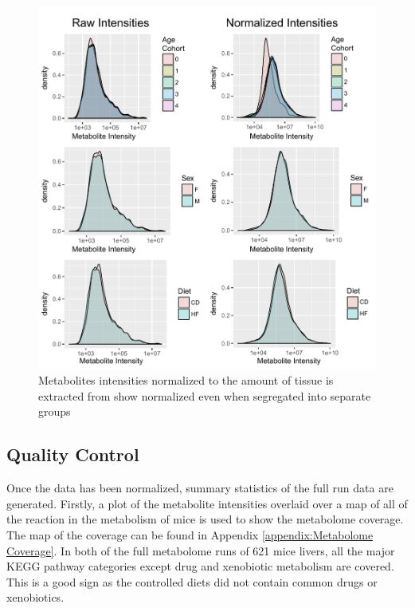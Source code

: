 \documentclass[a4paper,11pt,twoside]{book}
\begin{document}
	\begin{figure}[ht!b]
		\centering
		\includegraphics[width=\linewidth]{3.Metabolomics/Factor_Densities_Final.pdf}
		\caption{Metabolites intensities normalized to the amount of tissue is extracted from show normalized even when segregated into separate groups}
		\label{fig: Meatbolite Data Normalization}
	\end{figure}
	
	\subsection{Quality Control}
	
    Once the data has been normalized, summary statistics of the full run data are generated. Firstly, a plot of the metabolite intensities overlaid over a map of all of the reaction in the metabolism of mice is used to show the metabolome coverage. The map of the coverage can be found in Appendix \ref{appendix:Metabolome Coverage}. In both of the full metabolome runs of 621 mice livers, all the major KEGG pathway categories except drug and xenobiotic metabolism are covered. This is a good sign as the controlled diets did not contain common drugs or xenobiotics. 
	
\end{document}

